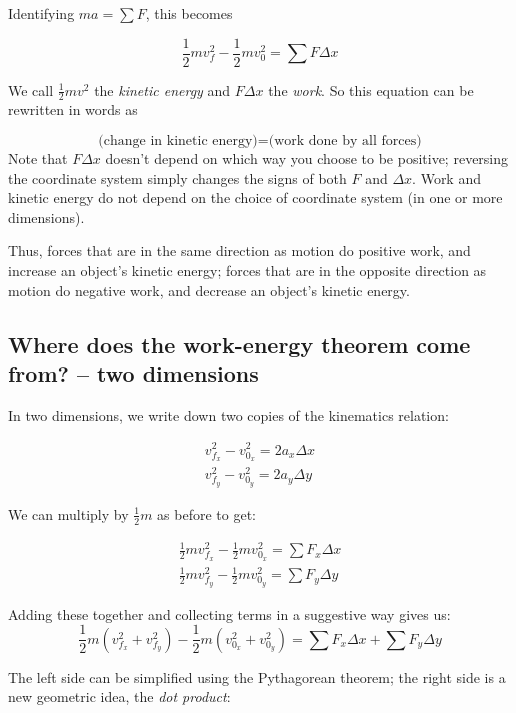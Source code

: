 \documentclass[10pt]{article}
\begin{document}
Identifying $ma = \sum F$, this becomes

\begin{equation}
 \frac{1}{2}mv_f^2 - \frac{1}{2}mv_0^2 = \sum F \Delta x
 \end{equation}

We call $\frac{1}{2}mv^2$ the {\it kinetic energy} and $F \Delta x$ the {\it work}. So this equation can be rewritten in words as

\begin{equation}
\text{(change in kinetic energy)} = \text{(work done by all forces)}
\end{equation}
Note that $F \Delta x$ doesn't depend on which way you choose to be positive; reversing the coordinate system simply changes the signs of both $F$ and $\Delta x$. Work and kinetic energy do not depend on the choice of coordinate system (in one or more dimensions).

Thus, forces that are in the same direction as motion do positive work, and increase an object's kinetic energy; forces that are in the opposite direction as motion do negative work, and decrease an object's kinetic energy.


\subsection{Where does the work-energy theorem come from? -- two dimensions}


In two dimensions, we write down two copies of the kinematics relation:

\begin{align*}
v_{f_x}^2 - v_{0_x}^2 = 2a_x\Delta x \nonumber \\
v_{f_y}^2 - v_{0_y}^2 = 2a_y\Delta y 
\end{align*}

We can multiply by $\frac{1}{2}m$ as before to get:


\begin{align*}
\frac{1}{2}mv_{f_x}^2 - \frac{1}{2}mv_{0_x}^2 = \sum F_x \Delta x \nonumber \\
\frac{1}{2}mv_{f_y}^2 - \frac{1}{2}mv_{0_y}^2 = \sum F_y \Delta y 
\end{align*}


Adding these together and collecting terms in a suggestive way gives us:
$$
\frac{1}{2}m(v_{f_x}^2 + v_{f_y}^2)  - \frac{1}{2}m(v_{0_x}^2 + v_{0_y}^2)= \sum F_x \Delta x + \sum F_y \Delta y
$$

The left side can be simplified using the Pythagorean theorem; the right side is a new geometric idea, the {\it dot product}:
\end{document}

